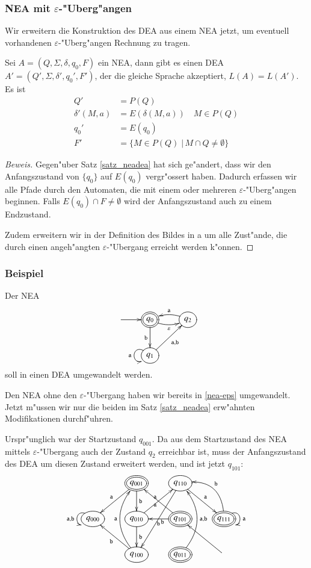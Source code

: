 \subsubsection{NEA mit $\varepsilon$-"Uberg"angen}
Wir erweitern die Konstruktion des DEA aus einem NEA jetzt, um eventuell
vorhandenen $\varepsilon$-"Uberg"angen Rechnung zu tragen.

\begin{satz}
\label{satz_neadea}
Sei $A=(Q,\Sigma,\delta,q_0,F)$ ein NEA, dann gibt es einen
DEA $A'=(Q',\Sigma,\delta',q_0',F')$, der die gleiche Sprache
akzeptiert, $L(A)=L(A')$. Es ist
\begin{align*}
Q'&=P(Q)\\
\delta'(M,a)&=E(\delta(M, a))\quad M\in P(Q)\\
q_0'&=E(q_0)\\
F'&=\{M\in P(Q)\;|\, M\cap Q\ne \emptyset\}
\end{align*}
\end{satz}

\begin{proof}[Beweis]
Gegen"uber Satz \ref{satz_neadea} hat sich ge"andert, dass wir den
Anfangszustand von $\{q_0\}$ auf $E(q_0)$ vergr"ossert haben. Dadurch
erfassen wir alle Pfade durch den Automaten, die mit einem oder
mehreren $\varepsilon$-"Uberg"angen beginnen. Falls $E(q_0)\cap F\ne \emptyset$
wird der Anfangszustand auch zu einem Endzustand.

Zudem erweitern wir in der Definition des Bildes in a um alle Zust"ande,
die durch einen angeh"angten $\varepsilon$-"Ubergang erreicht werden
k"onnen.
\end{proof}

\subsubsection{Beispiel}
Der NEA 
\[
\entrymodifiers={++[o][F]}
\xymatrix{
*+\txt{}\ar[r]
	&*++[o][F=]{q_0} \ar[d]_{\tt b} \ar@/_/[r]_{\varepsilon}
		&{q_2}\ar@/_/[l]_{\tt a}
\\
*+\txt{}
	&{q_1}\ar[ur]_{{\tt a},{\tt b}} \ar@(ul,dl)_{\tt a}
}
\]
soll in einen DEA umgewandelt werden.

Den NEA ohne den $\varepsilon$-"Ubergang haben wir bereits in
\ref{nea-eps} umgewandelt. Jetzt m"ussen wir nur die beiden
im Satz \ref{satz_neadea} erw"ahnten Modifikationen durchf"uhren.

Urspr"unglich war der Startzustand $q_{001}$. Da aus dem Startzustand
des NEA mittels $\varepsilon$-"Ubergang auch der Zustand $q_2$
erreichbar ist, muss der Anfangszustand des DEA um diesen Zustand
erweitert werden, und ist jetzt $q_{101}$:
\[
\entrymodifiers={++[o][F]}
\xymatrix{
*+\txt{}
	&*++[o][F=]{q_{001}} \ar[d]^{\tt b}\ar[dl]_{\tt a}
		&{q_{110}}\ar[dr]^{\tt a} \ar[ddl]^{\tt b}
\\
{q_{000}}\ar@(ul,dl)_{{\tt a},{\tt b}}
	&{q_{010}} \ar[ur]^{\tt a} \ar[d]^{\tt b}
		&*++[o][F=]{q_{101}} \ar[ul]^{\tt a} \ar[l]^{\tt b}
			&*++[o][F=]{q_{111}}\ar@(ur,dr)^{{\tt a}} \ar@/_20pt/[ul]_{\tt b}
\\
*+\txt{}
	&{q_{100}}\ar@/^20pt/[uu]^{\tt a} \ar[ul]^{\tt b}
		&*++[o][F=]{q_{011}} \ar@/_20pt/[uu]_{{\tt a},{\tt b}}
			&*+\txt{}\ar[ul]
}
\]


